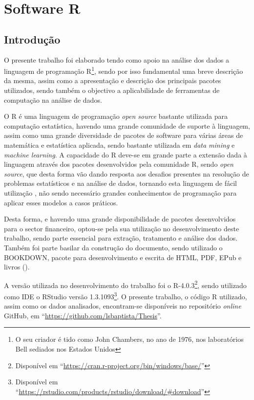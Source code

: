 \documentclass[
  12pt,
  a4paper,
  openany]{book}
\begin{document}
\hypertarget{software-r}{%
\chapter{Software R}\label{software-r}}

\newpage

\hypertarget{introduuxe7uxe3o}{%
\section{Introdução}\label{introduuxe7uxe3o}}

O presente trabalho foi elaborado tendo como apoio na análise dos dados a linguagem de programação R\footnote{O seu criador é tido como John Chambers, no ano de 1976, nos laboratórios Bell sediados nos Estados Unidos}, sendo por isso fundamental uma breve descrição da mesma, assim como a apresentação e descrição dos principais pacotes utilizados, sendo também o objectivo a aplicabilidade de ferramentas de computação na análise de dados.

O R é uma linguagem de programação \emph{open source} bastante utilizada para computação estatística, havendo uma grande comunidade de suporte à linguagem, assim como uma grande diversidade de pacotes de software para várias áreas de matemática e estatística aplicada, sendo bastante utilizada em \emph{data mining} e \emph{machine learning}. A capacidade do R deve-se em grande parte a extensão dada à linguagem através dos pacotes desenvolvidos pela comunidade R, sendo \emph{open source}, que desta forma vão dando resposta aos desafios presentes na resolução de problemas estatísticos e na análise de dados, tornando esta linguagem de fácil utilização , não sendo necessário grandes conhecimentos de programação para aplicar esses modelos a casos práticos.

Desta forma, e havendo uma grande disponibilidade de pacotes desenvolvidos para o sector financeiro, optou-se pela sua utilização no desenvolvimento deste trabalho, sendo parte essencial para extração, tratamento e análise dos dados. Também foi parte basilar da construção do documento, sendo utilizado o BOOKDOWN, pacote para desenvolvimento e escrita de HTML, PDF, EPub e livros (\citet{R-bookdown}).

A versão utilizada no desenvolvimento do trabalho foi o R-4.0.3\footnote{Disponível em ``\url{https://cran.r-project.org/bin/windows/base/}''}, sendo utilizado como IDE o RStudio versão 1.3.1093\footnote{Disponível em ``\url{https://rstudio.com/products/rstudio/download/\#download}''}. O presente trabalho, o código R utilizado, assim como os dados analisados, encontram-se disponíveis no repositório \emph{online} GitHub, em ``\url{https://github.com/lsbaptista/Thesis}''.
\end{document}
